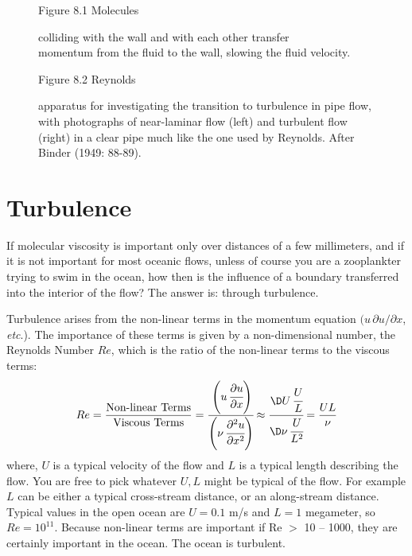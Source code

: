 \begin{figure}[t!]
\centering
\footnotesize
Figure 8.1 Molecules \rule{0mm}{4ex}colliding with the wall and
with each other transfer\\momentum from the fluid to the wall, slowing the fluid
velocity.

\label{fig:viscositysketch}
\vspace{-3ex}
\end{figure}

\begin{figure}[t!]
\footnotesize
Figure 8.2 Reynolds \rule{0mm}{4ex}apparatus for investigating the transition to
turbulence in pipe flow, with photographs of near-laminar flow
(left) and turbulent flow (right) in a clear pipe much like the one used by Reynolds. After
Binder (1949: 88-89).
\label{fig:reynoldsexp}
\vspace{-4ex}
\end{figure}

\section{Turbulence}
If molecular viscosity is important only over distances
of a few millimeters, and if it is not important for most oceanic flows, unless of
course you are a zooplankter trying to swim in the ocean, how then is the influence
of a boundary transferred into the interior of the flow? The answer is: through
turbulence.

Turbulence arises from the non-linear terms in the momentum equation
$(u\,\partial{u}/\partial{x}$, \textit{etc}.). The importance of these terms is
given by a non-dimensional number, the Reynolds Number $Re$, which is the ratio of
the non-linear terms to the viscous terms:
\begin{equation}
Re = \frac{\text{Non-linear Terms}}{\text{Viscous
Terms}} =
\cfrac{\left( \displaystyle u\,\cfrac{\partial{u}}{\partial{x}}\right) }{\left( \displaystyle \nu\,\cfrac{\partial^2{u}}{\partial{x^2}}\right)
} \approx \cfrac{\D U\,\cfrac{U}{L\vphantom{y}}}{\D \nu\,\cfrac{U}{L^2}}
= \frac{UL}{\nu}
\end{equation}
where, $U$ is a typical velocity of the flow and $L$ is a typical length
describing the flow. You are free to pick whatever $U,L$ might be typical of
the flow. For example $L$ can be either a typical cross-stream distance, or an
along-stream distance. Typical values in the open ocean are $U = 0.1$ m/s and
$L = 1$ megameter, so $Re = 10^{11}$. Because non-linear terms are important if
Re $>$ 10 -- 1000, they are certainly important in the ocean. The ocean is
turbulent.

